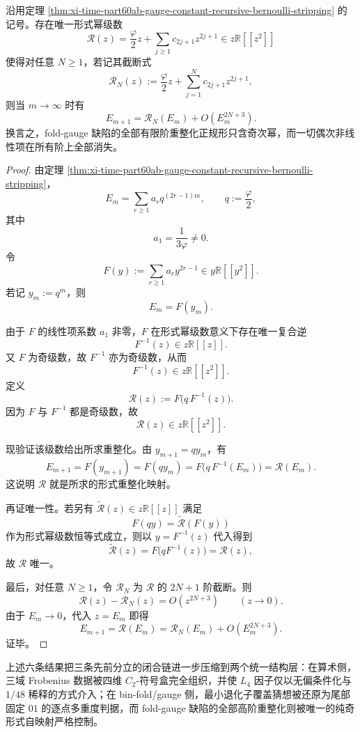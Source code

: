 \begin{theorem}\label{thm:xi-time-part64a-fold-gauge-purely-odd-renormalization}
沿用定理 \ref{thm:xi-time-part60ab-gauge-constant-recursive-bernoulli-stripping} 的记号。存在唯一形式幂级数
\[
\mathcal R(z)=\frac{\varphi}{2}z+\sum_{j\ge 1}c_{2j+1}z^{2j+1}
\in z\mathbb R[[z^2]]
\]
使得对任意 \(N\ge 1\)，若记其截断式
\[
\mathcal R_N(z):=\frac{\varphi}{2}z+\sum_{j=1}^{N}c_{2j+1}z^{2j+1},
\]
则当 \(m\to\infty\) 时有
\[
E_{m+1}=\mathcal R_N(E_m)+O(E_m^{2N+3}).
\]
换言之，fold-gauge 缺陷的全部有限阶重整化正规形只含奇次幂，而一切偶次非线性项在所有阶上全部消失。
\end{theorem}
\begin{proof}
由定理 \ref{thm:xi-time-part60ab-gauge-constant-recursive-bernoulli-stripping}，
\[
E_m=\sum_{r\ge 1}a_r q^{(2r-1)m},
\qquad
q:=\frac{\varphi}{2},
\]
其中
\[
a_1=\frac{1}{3\varphi}\neq 0.
\]
令
\[
F(y):=\sum_{r\ge 1}a_r y^{2r-1}\in y\mathbb R[[y^2]].
\]
若记 \(y_m:=q^m\)，则
\[
E_m=F(y_m).
\]

由于 \(F\) 的线性项系数 \(a_1\) 非零，\(F\) 在形式幂级数意义下存在唯一复合逆
\[
F^{-1}(z)\in z\mathbb R[[z]].
\]
又 \(F\) 为奇级数，故 \(F^{-1}\) 亦为奇级数，从而
\[
F^{-1}(z)\in z\mathbb R[[z^2]].
\]
定义
\[
\mathcal R(z):=F\!\bigl(q\,F^{-1}(z)\bigr).
\]
因为 \(F\) 与 \(F^{-1}\) 都是奇级数，故
\[
\mathcal R(z)\in z\mathbb R[[z^2]].
\]

现验证该级数给出所求重整化。由 \(y_{m+1}=qy_m\)，有
\[
E_{m+1}
=
F(y_{m+1})
=
F(qy_m)
=
F\!\bigl(q\,F^{-1}(E_m)\bigr)
=
\mathcal R(E_m).
\]
这说明 \(\mathcal R\) 就是所求的形式重整化映射。

再证唯一性。若另有 \(\widetilde{\mathcal R}(z)\in z\mathbb R[[z]]\) 满足
\[
F(qy)=\widetilde{\mathcal R}(F(y))
\]
作为形式幂级数恒等式成立，则以 \(y=F^{-1}(z)\) 代入得到
\[
\widetilde{\mathcal R}(z)=F\!\bigl(qF^{-1}(z)\bigr)=\mathcal R(z),
\]
故 \(\mathcal R\) 唯一。

最后，对任意 \(N\ge 1\)，令 \(\mathcal R_N\) 为 \(\mathcal R\) 的 \(2N+1\) 阶截断。则
\[
\mathcal R(z)-\mathcal R_N(z)=O(z^{2N+3})
\qquad(z\to 0).
\]
由于 \(E_m\to 0\)，代入 \(z=E_m\) 即得
\[
E_{m+1}
=
\mathcal R(E_m)
=
\mathcal R_N(E_m)+O(E_m^{2N+3}).
\]
证毕。
\end{proof}

\noindent
上述六条结果把三条先前分立的闭合链进一步压缩到两个统一结构层：在算术侧，三域 Frobenius 数据被四维 \(C_2\)-符号盒完全组织，并使 \(L_4\) 因子仅以无偏条件化与 \(1/48\) 稀释的方式介入；在 bin-fold/gauge 侧，最小退化子覆盖猜想被还原为尾部固定 \(01\) 的逐点多重度判据，而 fold-gauge 缺陷的全部高阶重整化则被唯一的纯奇形式自映射严格控制。

\endinput

